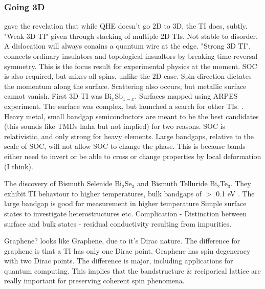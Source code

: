 \documentclass[../mattg_ti-fi_lit-review.tex]{subfiles}
\begin{document}
	\subsubsection{Going 3D}
	\begin{outline}
		 gave the revelation that while QHE doesn't go 2D to 3D, the TI does, subtly. \cite{fu_topological_2007, moore_topological_2007, roy_topological_2009}
		\1 "Weak 3D TI" given through stacking of multiple 2D TIs. Not stable to disorder. A dislocation will always conains a quantum wire at the edge.
		\1 "Strong 3D TI", connects ordinary insulators and topological insualtors by breaking time-reversal symmetry. \cite{moore_topological_2007} This is the focus result for experimental physics at the moment.
		\1 SOC is also required, but mixes all spins, unlike the 2D case. Spin direction dictates the momentum along the surface. Scattering also occurs, but metallic surface cannot vanish.
		\1 First 3D TI was Bi$_x$Sb$_{1-x}$. Surfaces mapped using ARPES experiment. The surface was complex, but launched a search for other TIs. \cite{hsieh_topological_2008,hsieh_observation_2009}.
		\1 Heavy metal, small bandgap semiconductors are meant to be the best candidates (this sounds like TMDs haha but not implied) for two reasons.
		\2 SOC is relativistic, and only strong for heavy elements.
		\2 Large bandgaps, relative to the scale of SOC, will not allow SOC to change the phase. This is because bands either need to invert or be able to cross or change properties by local deformation (I think).
		
		\1 The discovery of Bismuth Selenide Bi$_2$Se$_3$ and Bismuth Telluride Bi$_2$Te$_3$. They exhibit TI behaviour to higher temperatures, bulk bandgaps of $>$ 0.1 eV \cite{xia_observation_2009,zhang_topological_2009,chen_experimental_2009}.
		\2 The large bandgap is good for measurement in higher temperature
		\2 Simple surface states to investigate heterostructures etc. 
		\2 Complication - Distinction between surface and bulk states - residual conductivity resulting from impurities.
		
		\1 Graphene? \bismuthselinide{} looks like Graphene, due to it's Dirac nature. The difference for graphene is that a TI has only one Dirac point. Graphene has spin degeneracy with two Dirac points. The difference is major, including applications for quantum computing. This implies that the bandstructure \& reciporical lattice are really important for preserving coherent spin phenomena.
		

\end{outline}
\end{document}
